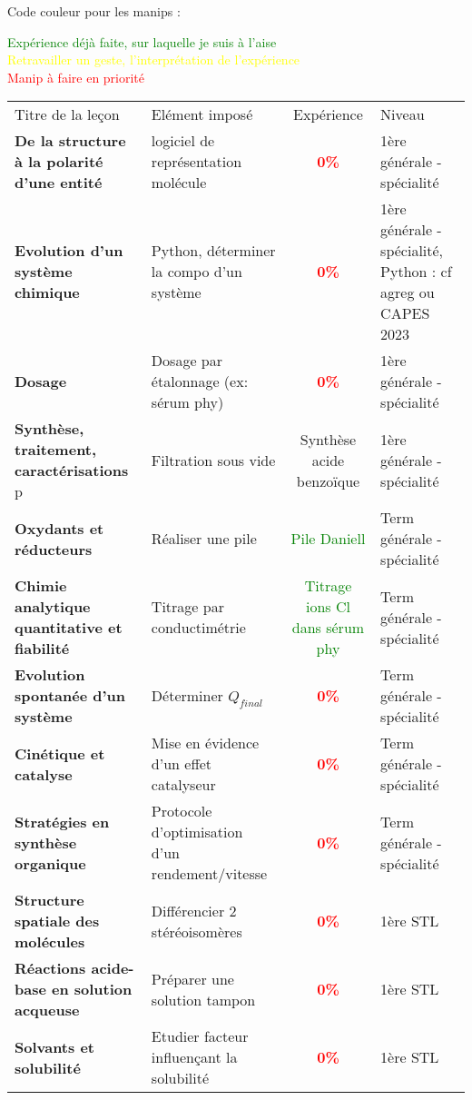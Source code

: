 \begin{changemargin}{-1.5cm}{-0cm}

Code couleur pour les manips :
\begin{center}
\textcolor{green}{Expérience déjà faite, sur laquelle je suis à l'aise}\\
\textcolor{yellow}{Retravailler un geste, l'interprétation de l'expérience}\\
\textcolor{red}{Manip à faire en priorité}\\
\end{center}

\begin{tabularx}{\paperwidth-2cm}{| X | X | c | X |}
  \hline
  \rowcolor{gray!20}\multicolumn{4}{c}{Avancement préparation oraux Leçons Chimie} \\
  \hline 
  Titre de la leçon & Elément imposé & Expérience & Niveau \\
  \hline
  \textbf{De la structure à la polarité d'une entité} & logiciel de représentation molécule & \textcolor{red}{\textbf{0\%}}  & 1ère générale - spécialité  \\
  \hline
  \textbf{Evolution d'un système chimique} & Python, déterminer la compo d'un système & \textcolor{red}{\textbf{0\%}}  & 1ère générale - spécialité, Python : cf agreg ou CAPES 2023  \\
  \hline
  \textbf{Dosage} & Dosage par étalonnage (ex: sérum phy) & \textcolor{red}{\textbf{0\%}}  & 1ère générale - spécialité \\
  \hline
  \textbf{Synthèse, traitement, caractérisations} p\pageref{LC_SyntheseTraitement} & Filtration sous vide & Synthèse acide benzoïque  & 1ère générale - spécialité \\
  \hline
  \hline
  \textbf{Oxydants et réducteurs} & Réaliser une pile & \textcolor{green}{Pile Daniell}  & Term générale - spécialité \\
  \hline
  \textbf{Chimie analytique quantitative et fiabilité} & Titrage par conductimétrie & \textcolor{green}{Titrage ions Cl dans sérum phy}  & Term générale - spécialité  \\
  \hline
  \textbf{Evolution spontanée d'un système} & Déterminer $Q_{final}$ & \textcolor{red}{\textbf{0\%}}  & Term générale - spécialité  \\
  \hline
  \textbf{Cinétique et catalyse} & Mise en évidence d'un effet catalyseur & \textcolor{red}{\textbf{0\%}}  & Term générale - spécialité  \\
  \hline
  \textbf{Stratégies en synthèse organique} & Protocole d'optimisation d'un rendement/vitesse & \textcolor{red}{\textbf{0\%}}  & Term générale - spécialité  \\
  \hline
  \hline
   \textbf{Structure spatiale des molécules} & Différencier 2 stéréoisomères & \textcolor{red}{\textbf{0\%}}  & 1ère STL  \\
  \hline
  \textbf{Réactions acide-base en solution acqueuse} & Préparer une solution tampon & \textcolor{red}{\textbf{0\%}}  & 1ère STL  \\
  \hline
  \textbf{Solvants et solubilité} & Etudier facteur influençant la solubilité & \textcolor{red}{\textbf{0\%}}  & 1ère STL  \\
  \hline
  

\end{tabularx}
\end{changemargin}
